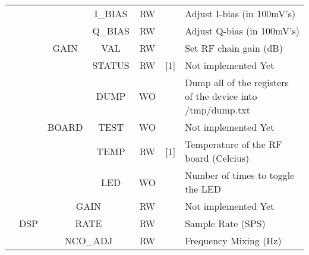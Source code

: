 \documentclass[11pt]{article}
\begin{document}
{\begin{landscape}
\begin{table}[H]
\begin{tabular}{|c|c|c|c|c|c|l|}
                       &                         &                        & I\_BIAS   & RW                &             & Adjust I-bias (in 100mV's)                                            \\ \cline{4-7} 
                       &                         &                        & Q\_BIAS   & RW                &             & Adjust Q-bias (in 100mV's)                                            \\ \cline{3-7} 
                       &                         & GAIN                   & VAL       & RW                &             & Set RF chain gain (dB)                                                \\ \cline{3-7} 
                       &                         & \multirow{5}{*}{BOARD} & STATUS    & RW                & [1]         & Not implemented Yet                                                   \\ \cline{4-7} 
                       &                         &                        & DUMP      & WO                &             & Dump all of the registers of the device into /tmp/dump.txt            \\ \cline{4-7} 
                       &                         &                        & TEST      & WO                &             & Not implemented Yet                                                   \\ \cline{4-7} 
                       &                         &                        & TEMP      & RW                & [1]         & Temperature of the RF board (Celcius)                                 \\ \cline{4-7} 
                       &                         &                        & LED       & WO                &             & Number of times to toggle the LED                                     \\ \cline{2-7} 
                       & \multirow{4}{*}{DSP}    & \multicolumn{2}{c|}{GAIN}          & RW                &             & Not implemented Yet                                                   \\ \cline{3-7} 
                       &                         & \multicolumn{2}{c|}{RATE}          & RW                & {\bf }      & Sample Rate (SPS)                                                     \\ \cline{3-7} 
                       &                         & \multicolumn{2}{c|}{NCO\_ADJ}      & RW                &             & Frequency Mixing (Hz)                                                 \\ \cline{3-7} 

\end{tabular}
\end{table}
\end{landscape}}
\end{document}
